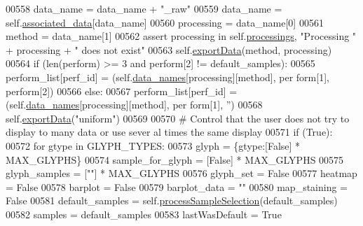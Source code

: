 \begin{DoxyCode}
00558                     data\_name = data\_name + \textcolor{stringliteral}{"\_raw"}
00559                 data\_name = self.\hyperlink{classnavicom_1_1navicom_1_1NaviCom_a1d7072ae29e32d7ddd1da9cc5def7199}{associated_data}[data\_name]
00560             processing = data\_name[0]
00561             method = data\_name[1]
00562             \textcolor{keyword}{assert} processing \textcolor{keywordflow}{in} self.\hyperlink{classnavicom_1_1navicom_1_1NaviCom_a5a255d56e997ddcc653d8f06c741ea13}{processings}, \textcolor{stringliteral}{"Processing "} + processing + \textcolor{stringliteral}{"
       does not exist"}
00563             self.\hyperlink{classnavicom_1_1navicom_1_1NaviCom_a7395c2253695b46bf95cd48ed1be6d3e}{exportData}(method, processing)
00564             \textcolor{keywordflow}{if} (len(perform) >= 3 \textcolor{keywordflow}{and} perform[2] != default\_samples):
00565                 perform\_list[perf\_id] = (self.\hyperlink{classnavicom_1_1navicom_1_1NaviCom_a68646454fe1481b0065d2f43548319df}{data_names}[processing][method], per
      form[1], perform[2])
00566             \textcolor{keywordflow}{else}:
00567                 perform\_list[perf\_id] = (self.\hyperlink{classnavicom_1_1navicom_1_1NaviCom_a68646454fe1481b0065d2f43548319df}{data_names}[processing][method], per
      form[1], \textcolor{stringliteral}{''})
00568         self.\hyperlink{classnavicom_1_1navicom_1_1NaviCom_a7395c2253695b46bf95cd48ed1be6d3e}{exportData}(\textcolor{stringliteral}{"uniform"})
00569 
00570         \textcolor{comment}{# Control that the user does not try to display to many data or use sever
      al times the same display}
00571         \textcolor{keywordflow}{if} (\textcolor{keyword}{True}):
00572             \textcolor{keywordflow}{for} gtype \textcolor{keywordflow}{in} GLYPH\_TYPES:
00573                 glyph = \{gtype:[\textcolor{keyword}{False}] * MAX\_GLYPHS\}
00574             sample\_for\_glyph = [\textcolor{keyword}{False}] * MAX\_GLYPHS
00575             glyph\_samples = [\textcolor{stringliteral}{""}] * MAX\_GLYPHS
00576             glyph\_set = \textcolor{keyword}{False}
00577             heatmap = \textcolor{keyword}{False}
00578             barplot = \textcolor{keyword}{False}
00579             barplot\_data = \textcolor{stringliteral}{""}
00580             map\_staining = \textcolor{keyword}{False}
00581             default\_samples = self.\hyperlink{classnavicom_1_1navicom_1_1NaviCom_a6536cf86235df90cb7443c23f11870e4}{processSampleSelection}(default\_samples)
00582             samples = default\_samples
00583             lastWasDefault = \textcolor{keyword}{True}

\end{DoxyCode}
